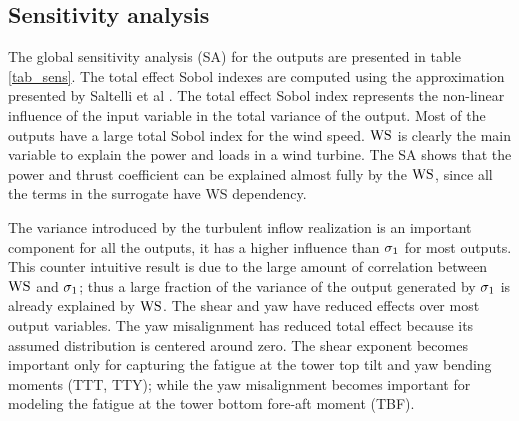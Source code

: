 \documentclass[preprint,12pt]{elsarticle}
\begin{document}
\subsection{Sensitivity analysis}

The global sensitivity analysis (SA) for the outputs are presented in table \ref{tab_sens}. The total effect Sobol indexes are computed using the approximation presented by Saltelli et al \cite{saltelli2010variance}. The total effect Sobol index represents the non-linear influence of the input variable in the total variance of the output. Most of the outputs have a large total Sobol index for the wind speed. $\text{WS}$ is clearly the main variable to explain the power and loads in a wind turbine. The SA shows that the power and thrust coefficient can be explained almost fully by the $\text{WS}$, since all the terms in the surrogate have WS dependency. 

The variance introduced by the turbulent inflow realization is an important component for all the outputs, it has a higher influence than $\sigma_{1}$ for most outputs. This counter intuitive result is due to the large amount of correlation between $\text{WS}$ and $\sigma_{1}$; thus a large fraction of the variance of the output generated by $\sigma_{1}$ is already explained by $\text{WS}$. The shear and yaw have reduced effects over most output variables. The yaw misalignment has reduced total effect because its assumed distribution is centered around zero. The shear exponent becomes important only for capturing the fatigue at the tower top tilt and yaw bending moments (TTT, TTY); while the yaw misalignment becomes important for modeling the fatigue at the tower bottom fore-aft moment (TBF).
\end{document}
